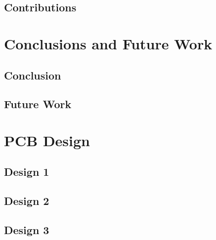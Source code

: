 \documentclass[12pt,openany,a4paper]{book}
\begin{document}
\section{Contributions}














\chapter{Conclusions and Future Work}

\section{Conclusion}


\section{Future Work}







\appendix
{}


\newpage
\chapter{PCB Design}
\section{Design 1}	\label{sec:pcb_design1}

\section{Design 2}	\label{sec:pcb_design2}

\section{Design 3}	\label{sec:pcb_design3}
\end{document}
